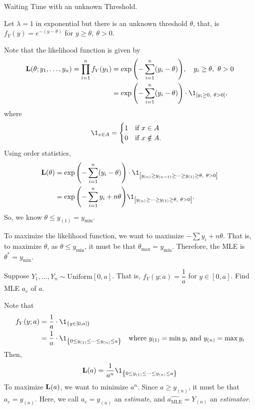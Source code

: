 \begin{eg}
	Waiting Time with an unknown Threshold.\par 
	Let $\lambda=1$ in exponential but there is an unknown threshold $\theta$, that, is $f_Y(y)=e^{-(y-\theta)}$ for $y\geq\theta,\ \theta>0$.	
	\begin{sol}
		Note that the likelihood function is given by \begin{align*}\L(\theta;y_1,\dots,y_n)=\prod_{i=1}^nf_Y(y_1)&=\exp\qty(-\sum_{i=1}^n(y_i-\theta)),\quad y_i\geq\theta,\ \theta>0\\&=\exp\qty(-\sum_{i=1}^n(y_i-\theta))\cdot\1_{\qty[y_i\geq0,\ \theta>0]},\end{align*} where \[\1_{x\in A}=\begin{cases}1\quad\text{if }x\in A\\0\quad\text{if }x\notin A.\end{cases}\] Using order statistics, \begin{align*}\L(\theta)&=\exp\qty(-\sum_{i=1}^n(y_i-\theta))\cdot\1_{\qty[y_{(n)}\geq y_{(n-1)}\geq\cdots\geq y_{(1)}\geq\theta,\ \theta>0]}\\&=\exp\qty(-\sum_{i=1}^ny_i+n\theta)\1_{\qty[y_{(n)}\geq\cdots\geq y_{(1)}\geq\theta,\ \theta>0]}.\end{align*}
		So, we know $\theta\leq y_{(1)}=y_{\min}$. \par 
		To maximize the likelihood function, we want to maximize $-\sum y_i+n\theta$. That is, to maximize $\theta$, as $\theta\leq y_{\min}$, it must be that $\theta_{\max}=y_{\min}$. Therefore, the MLE is $\theta^*=y_{\min}.$
	\end{sol}
\end{eg}
\begin{eg}
	Suppose $Y_1,\dots,Y_n\sim\text{Uniform}[0,a]$. That is, $f_Y(y;a)=\dfrac{1}{a}$ for $y\in[0,a]$. Find MLE $a_e$ of $a$. 
	\begin{sol}
		Note that \begin{align*}f_Y(y;a)&=\dfrac{1}{a}\cdot\1_{\qty{y\in[0,a]}}\\&=\dfrac{1}{a}\cdot\1_{\qty{0\leq y_{(1)}\leq\cdots\leq y_{(n)}\leq a}}&\text{where } y_{(1)}=\min y_i\text{ and } y_{(n)}=\max y_i\end{align*} Then, \[\L(a)=\dfrac{1}{a^n}\1_{\qty{0\leq y_{(1)}\leq\cdots\leq y_{(n)}\leq a}}\] To maximize $\vb{L}(a)$, we want to minimize $a^n$. Since $a\geq y_{(n)}$, it must be that $a_e=y_{(n)}$. 
		Here, we call $a_e=y_{(n)}$ an \textit{estimate}, and $\hat{a_{\text{MLE}}}=Y_{(n)}$ an \textit{estimator}.
	\end{sol}
\end{eg}
